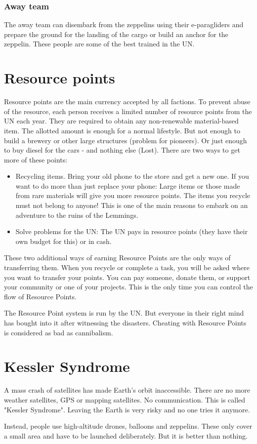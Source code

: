 \subsubsection{Away team}
\label{sec: UN away team}
The away team can disembark from the zeppelins using their e-paragliders and prepare the ground for the landing of the cargo or build an anchor for the zeppelin. These people are some of the best trained in the UN.

\section{Resource points}
\label{sec:Resource Points}
Resource points are the main currency accepted by all factions. To prevent abuse of the resource, each person receives a limited number of resource points from the UN each year. They are required to obtain any non-renewable material-based item. The allotted amount is enough for a normal lifestyle. But not enough to build a brewery or other large structures (problem for pioneers). Or just enough to buy diesel for the cars - and nothing else (Lost). There are two ways to get more of these points:

\begin{itemize}
    \item Recycling items. Bring your old phone to the store and get a new one. If you want to do more than just replace your phone: Large items or those made from rare materials will give you more resource points. The items you recycle must not belong to anyone! This is one of the main reasons to embark on an adventure to the ruins of the Lemmings.
    \item Solve problems for the UN: The UN pays in resource points (they have their own budget for this) or in cash.
\end{itemize}

These two additional ways of earning Resource Points are the only ways of transferring them. When you recycle or complete a task, you will be asked where you want to transfer your points. You can pay someone, donate them, or support your community or one of your projects. This is the only time you can control the flow of Resource Points.

The Resource Point system is run by the UN. But everyone in their right mind has bought into it after witnessing the disasters. Cheating with Resource Points is considered as bad as cannibalism.



\section{Kessler Syndrome}
\label{sec: Kessler Syndrome}
A mass crash of satellites has made Earth's orbit inaccessible. There are no more weather satellites, GPS or mapping satellites. No communication.
This is called "Kessler Syndrome". Leaving the Earth is very risky and no one tries it anymore.

Instead, people use high-altitude drones, balloons and zeppelins. These only cover a small area and have to be launched deliberately. But it is better than nothing.
